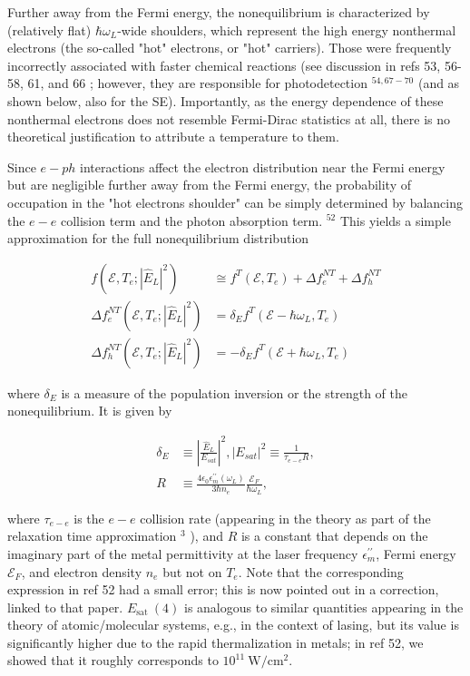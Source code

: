 \documentclass[10pt]{article}
\begin{document}
Further away from the Fermi energy, the nonequilibrium is characterized by (relatively flat) $\hbar \omega_{L}$-wide shoulders, which represent the high energy nonthermal electrons (the so-called "hot" electrons, or "hot" carriers). Those were frequently incorrectly associated with faster chemical reactions (see discussion in refs 53, 56-58, 61, and 66 ; however, they are responsible for photodetection ${ }^{54,67-70}$ (and as shown below, also for the SE). Importantly, as the energy dependence of these nonthermal electrons does not resemble Fermi-Dirac statistics at all, there is no theoretical justification to attribute a temperature to them.

Since $e-p h$ interactions affect the electron distribution near the Fermi energy but are negligible further away from the Fermi energy, the probability of occupation in the "hot electrons shoulder" can be simply determined by balancing the $e-e$ collision term and the photon absorption term. ${ }^{52}$ This yields a simple approximation for the full nonequilibrium distribution

\[
\begin{array}{ll}
f\left(\mathcal{E}, T_{e} ;\left|\hat{E}_{L}\right|^{2}\right) & \cong f^{T}\left(\mathcal{E}, T_{e}\right)+\Delta f_{e}^{N T}+\Delta f_{h}^{N T} \\
\Delta f_{e}^{N T}\left(\mathcal{E}, T_{e} ;\left|\hat{E}_{L}\right|^{2}\right) & =\delta_{E} f^{T}\left(\mathcal{E}-\hbar \omega_{L}, T_{e}\right) \\
\Delta f_{h}^{N T}\left(\mathcal{E}, T_{e} ;\left|\hat{E}_{L}\right|^{2}\right) & =-\delta_{E} f^{T}\left(\mathcal{E}+\hbar \omega_{L}, T_{e}\right) \tag{3}
\end{array}
\]

where $\delta_{E}$ is a measure of the population inversion or the strength of the nonequilibrium. It is given by


\begin{align*}
\delta_{E} & \equiv\left|\frac{\hat{E}_{L}}{E_{s a t}}\right|^{2},\left|E_{s a t}\right|^{2} \equiv \frac{1}{\tau_{e-e} R}, \\
R & \equiv \frac{4 \epsilon_{0} \epsilon_{m}^{\prime \prime}\left(\omega_{L}\right)}{3 \hbar n_{e}} \frac{\mathcal{E}_{F}}{\hbar \omega_{L}}, \tag{4}
\end{align*}


where $\tau_{e-e}$ is the $e-e$ collision rate (appearing in the theory as part of the relaxation time approximation ${ }^{3}$ ), and $R$ is a constant that depends on the imaginary part of the metal permittivity at the laser frequency $\epsilon_{m}^{\prime \prime}$, Fermi energy $\mathcal{E}_{F}$, and electron density $n_{e}$ but not on $T_{e}$. Note that the corresponding expression in ref 52 had a small error; this is now pointed out in a correction, linked to that paper. $E_{\text {sat }}(4)$ is analogous to similar quantities appearing in the theory of atomic/molecular systems, e.g., in the context of lasing, but its value is significantly higher due to the rapid thermalization in metals; in ref 52, we showed that it roughly corresponds to $10^{11} \mathrm{~W} / \mathrm{cm}^{2}$.
\end{document}
